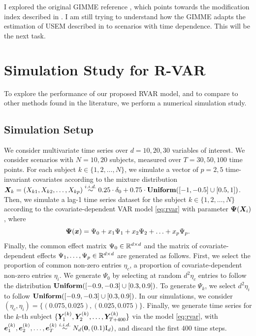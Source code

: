 I explored the original GIMME reference \citet{gates2012group}, which points towards the modification index described in \citet{sorbom1989model}. I am still trying to understand how the GIMME adapts the estimation of USEM described in \citet{sorbom1989model} to scenarios with time dependence. This will be the next task.




\section{Simulation Study for R-VAR}

To explore the performance of our proposed RVAR model, and to compare to other methods found in the literature, we perform a numerical simulation study.

\subsection{Simulation Setup}



We consider multivariate time series over $d = 10, 20, 30$ variables of interest. We consider scenarios with $N = 10, 20$ subjects, measured over $T = 30, 50, 100$ time points. For each subject $k\in\{1,2,\ldots , N\}$, we simulate a vector of $p = 2,5$ time-invariant covariates according to the mixture distribution $\bm{X}_{k} = (X_{k1},X_{k2},\ldots , X_{kp})\stackrel{i.i.d.}{\sim} 0.25\cdot \delta_{0} + 0.75\cdot\textbf{Uniform}([-1,-0.5]\cup [0.5,1])$. Then, we simulate a lag-1 time series dataset for the subject $k \in \{1,2,\ldots , N\}$ according to the covariate-dependent VAR model \eqref{eq:rvar} with parameter $\bm{\Psi}(\bm{X}_i)$, where 
\begin{equation*}
	\bm{\Psi}(\bm{x}) = \Psi_0 + x_1 \Psi_1 + x_2 \Psi_2 + \ldots + x_p \Psi_p.
\end{equation*}
Finally, the common effect matrix $\Psi_0\in\mathbb{R}^{d\times d}$ and the matrix of covariate-dependent effects $\Psi_1,\ldots,\Psi_p \in\mathbb{R}^{d\times d}$ are generated as follows. First, we select the proportion of common non-zero entries $\eta_{c}$, a proportion of covariate-dependent non-zero entries $\eta_{i}$. We generate $\Psi_0$ by selecting at random $d^2 \eta_{c}$ entries to follow the distribution $\textbf{Uniform}([-0.9,-0.3]\cup[0.3,0.9])$. To generate $\Psi_k$,  we select $d^2 \eta_{i}$ to follow $\textbf{Uniform}([-0.9,-0.3]\cup[0.3,0.9])$. In our simulations, we consider $(\eta_c, \eta_i) = \{ (0.075,0.025), (0.025,0.075)\}$. Finally, we generate time series for the $k$-th subject $\{\bm{Y}^{(k)}_1,\bm{Y}^{(k)}_2,\ldots,\bm{Y}^{(k)}_{T+400}\}$ via the model \eqref{eq:rvar}, with $\bm{e}^{(k)}_1, \bm{e}^{(k)}_2, \ldots, \bm{e}^{(k)}_T\stackrel{i.i.d.}{\sim} N_{d}({\mathbf{0}}, (0.1) \mathrm{I}_{d})$, and discard the first 400 time steps. 

